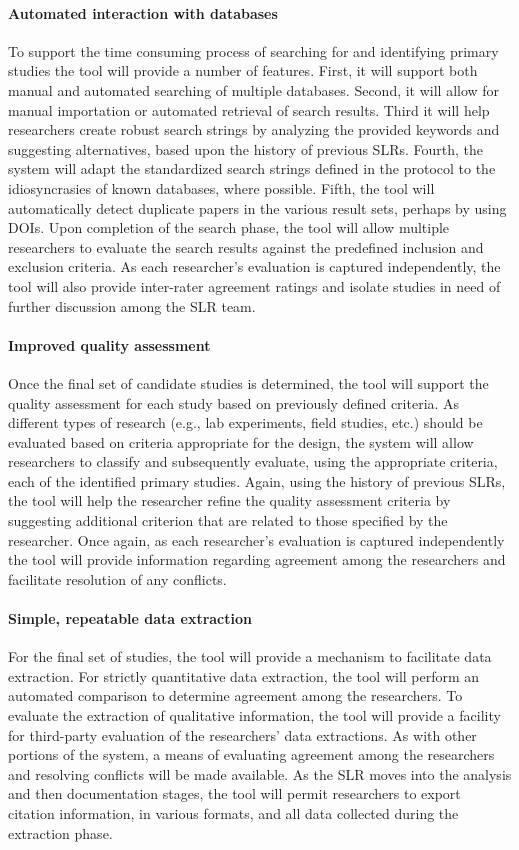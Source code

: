 \paragraph{Automated interaction with databases}
To support the time consuming process of searching for and identifying primary studies the tool will provide a number of features. First, it will support both manual and automated searching of multiple databases. Second, it will allow for manual importation or automated retrieval of search results. Third it will help researchers create robust search strings by analyzing the provided keywords and suggesting alternatives, based upon the history of previous SLRs. Fourth, the system will adapt the standardized search strings defined in the protocol to the idiosyncrasies of known databases, where possible. Fifth, the tool will automatically detect duplicate papers in the various result sets, perhaps by using DOIs. Upon completion of the search phase, the tool will allow multiple researchers to evaluate the search results against the predefined inclusion and exclusion criteria. As each researcher's evaluation is captured independently, the tool will also provide inter-rater agreement ratings and isolate studies in need of further discussion among the SLR team. 

\paragraph{Improved quality assessment}
Once the final set of candidate studies is determined, the tool will support the quality assessment for each study based on previously defined criteria. As different types of research (e.g., lab experiments, field studies, etc.) should be evaluated based on criteria appropriate for the design, the system will allow researchers to classify and subsequently evaluate, using the appropriate criteria, each of the identified primary studies. Again, using the history of previous SLRs, the tool will help the researcher refine the quality assessment criteria by suggesting additional criterion that are related to those specified by the researcher. Once again, as each researcher's evaluation is captured independently the tool will provide information regarding agreement among the researchers and facilitate resolution of any conflicts.

\paragraph{Simple, repeatable data extraction}
For the final set of studies, the tool will provide a mechanism to facilitate data extraction. For strictly quantitative data extraction, the tool will perform an automated comparison to determine agreement among the researchers. To evaluate the extraction of qualitative information, the tool will provide a facility for third-party evaluation of the researchers' data extractions. As with other portions of the system, a means of evaluating agreement among the researchers and resolving conflicts will be made available. As the SLR moves into the analysis and then documentation stages, the tool will permit researchers to export citation information, in various formats, and all data collected during the extraction phase. 

